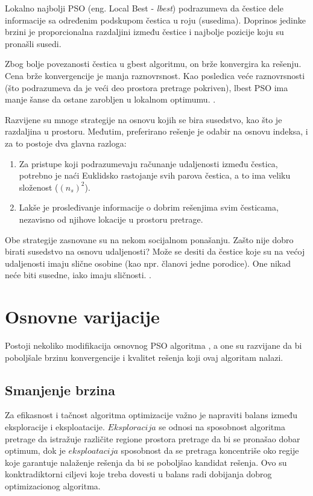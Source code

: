 \documentclass[a4paper]{article}
\begin{document}
Lokalno najbolji PSO (eng. Local Best - \textit{lbest}) podrazumeva da čestice dele informacije sa određenim podskupom čestica u roju (susedima). Doprinos jedinke brzini je proporcionalna razdaljini između čestice i najbolje pozicije koju su pronašli susedi. 

Zbog bolje povezanosti čestica u gbest algoritmu, on brže konvergira ka rešenju. Cena brže konvergencije je manja raznovrsnost. Kao posledica veće raznovrsnosti (što podrazumeva da je veći deo prostora pretrage pokriven), lbest PSO ima manje šanse da ostane zarobljen u lokalnom optimumu. \cite{engelbrecht2007computational}.

Razvijene su mnoge strategije na osnovu kojih se bira susedstvo, kao što je razdaljina u prostoru. Međutim, preferirano rešenje je odabir na osnovu indeksa, i za to postoje dva glavna razloga:
\begin{enumerate}
    \item Za pristupe koji podrazumevaju računanje udaljenosti između čestica, potrebno je naći Euklidsko rastojanje svih parova čestica, a to ima veliku složenost ($(n_s)^2$).
    \item Lakše je prosleđivanje informacije o dobrim rešenjima svim česticama, nezavisno od njihove lokacije u prostoru pretrage.

\end{enumerate}
Obe strategije zasnovane su na nekom socijalnom ponašanju. Zašto nije dobro birati susedstvo na osnovu udaljenosti?  Može se desiti da čestice koje su na većoj udaljenosti imaju slične osobine (kao npr. članovi jedne porodice). One nikad neće biti susedne, iako imaju sličnosti.  \cite{liu2006particle}.
    
    
\section{Osnovne varijacije}
Postoji nekoliko modifikacija osnovnog PSO algoritma \cite{rini2011particle}, a one su razvijane da bi poboljšale brzinu konvergencije i kvalitet rešenja koji ovaj algoritam nalazi.

\subsection{Smanjenje brzina}
Za efikasnost i tačnost algoritma optimizacije važno je napraviti balans između eksploracije i eksploatacije. 
$Eksploracija$ se odnosi na sposobnost algoritma pretrage da istražuje različite regione prostora pretrage da bi se pronašao dobar optimum, dok je $eksploatacija$ sposobnost  da se pretraga koncentriše oko regije koje garantuje nalaženje rešenja da bi se poboljšao kandidat rešenja. Ovo su konktradiktorni ciljevi koje treba dovesti u balans radi dobijanja dobrog optimizacionog algoritma.
\end{document}
